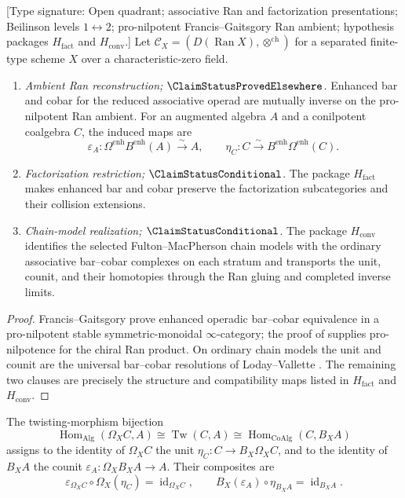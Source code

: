 \begin{theorem}
\label{thm:bar-cobar-platonic}
\textup{[Type signature: Open quadrant; associative Ran and
factorization presentations; Beilinson levels
\(1\leftrightarrow2\); pro-nilpotent Francis--Gaitsgory Ran ambient;
hypothesis packages \(H_{\mathrm{fact}}\) and
\(H_{\mathrm{conv}}\).]}
Let
\(\mathcal C_X=(D(\operatorname{Ran}X),\otimes^{\mathrm{ch}})\)
for a separated finite-type scheme \(X\) over a characteristic-zero
field.
\begin{enumerate}[label=\textup{(\roman*)}]
\item \emph{Ambient Ran reconstruction;
\(\ClaimStatusProvedElsewhere\).}
Enhanced bar and cobar for the reduced associative operad are mutually
inverse on the pro-nilpotent Ran ambient.  For an augmented algebra
\(A\) and a conilpotent coalgebra \(C\), the induced maps are
\[
 \varepsilon_A\colon\Omega^{\mathrm{enh}}B^{\mathrm{enh}}(A)
 \xrightarrow{\sim}A,
 \qquad
 \eta_C\colon C\xrightarrow{\sim}
 B^{\mathrm{enh}}\Omega^{\mathrm{enh}}(C).
\]
\item \emph{Factorization restriction;
\(\ClaimStatusConditional\).}
The package \(H_{\mathrm{fact}}\) makes enhanced bar and cobar preserve
the factorization subcategories and their collision extensions.
\item \emph{Chain-model realization;
\(\ClaimStatusConditional\).}
The package \(H_{\mathrm{conv}}\) identifies the selected
Fulton--MacPherson chain models with the ordinary associative
bar--cobar complexes on each stratum and transports the unit, counit,
and their homotopies through the Ran gluing and completed inverse
limits.
\end{enumerate}
\end{theorem}

\begin{proof}
Francis--Gaitsgory
\cite[Proposition~4.1.2]{Francis2012} prove enhanced operadic
bar--cobar equivalence in a pro-nilpotent stable symmetric-monoidal
\(\infty\)-category; the proof of
\cite[Theorem~5.1.1]{Francis2012} supplies pro-nilpotence for the
chiral Ran product.  On ordinary chain models the unit and counit are
the universal bar--cobar resolutions of
Loday--Vallette \cite[Corollary~2.3.4]{LV12}.  The remaining two
clauses are precisely the structure and compatibility maps listed in
\(H_{\mathrm{fact}}\) and \(H_{\mathrm{conv}}\).
\end{proof}

\begin{proposition}
\label{prop:unit-counit-normalization-bci}
The twisting-morphism bijection
\[
\operatorname{Hom}_{\mathrm{Alg}}(\Omega_XC,A)
\cong\operatorname{Tw}(C,A)
\cong\operatorname{Hom}_{\mathrm{CoAlg}}(C,B_XA)
\]
assigns to the identity of \(\Omega_XC\) the unit
\(\eta_C\colon C\to B_X\Omega_XC\), and to the identity of \(B_XA\)
the counit
\(\varepsilon_A\colon\Omega_XB_XA\to A\).  Their composites are
\[
\varepsilon_{\Omega_XC}\circ\Omega_X(\eta_C)
=\operatorname{id}_{\Omega_XC},
\qquad
B_X(\varepsilon_A)\circ\eta_{B_XA}
=\operatorname{id}_{B_XA}.
\]
\end{proposition}

